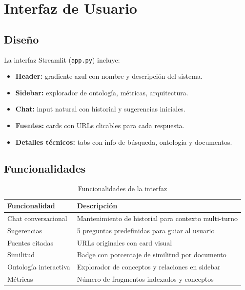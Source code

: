 \documentclass[12pt, a4paper, twoside]{report}
\begin{document}
\section{Interfaz de Usuario}

\subsection{Dise\~no}

La interfaz Streamlit (\texttt{app.py}) incluye:

\begin{itemize}
  \item \textbf{Header:} gradiente azul con nombre y descripci\'on del sistema.
  \item \textbf{Sidebar:} explorador de ontolog\'ia, m\'etricas, arquitectura.
  \item \textbf{Chat:} input natural con historial y sugerencias iniciales.
  \item \textbf{Fuentes:} cards con URLs clicables para cada respuesta.
  \item \textbf{Detalles t\'ecnicos:} tabs con info de b\'usqueda, ontolog\'ia y documentos.
\end{itemize}

\subsection{Funcionalidades}

\begin{table}[H]
\centering
\caption{Funcionalidades de la interfaz}
\label{tab:ui-features}
\begin{tabularx}{\textwidth}{lX}
\toprule
\textbf{Funcionalidad} & \textbf{Descripci\'on} \\
\midrule
Chat conversacional & Mantenimiento de historial para contexto multi-turno \\
Sugerencias & 5 preguntas predefinidas para guiar al usuario \\
Fuentes citadas & URLs originales con card visual \\
Similitud & Badge con porcentaje de similitud por documento \\
Ontolog\'ia interactiva & Explorador de conceptos y relaciones en sidebar \\
M\'etricas & N\'umero de fragmentos indexados y conceptos \\
\bottomrule
\end{tabularx}
\end{table}
\end{document}
